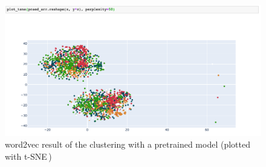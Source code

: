 \begin{figure}[ht]
  \begin{center}
    \includegraphics[width=\textwidth]{screenshots/google_word_2_vec_tsne_opti4.png}
    \caption{word2vec result of the clustering with a pretrained model (plotted with t-SNE\,\cite{maaten_visualizing_2008})}
    \label{fig:w2v-pretrained-4}
  \end{center}
\end{figure}
\FloatBarrier